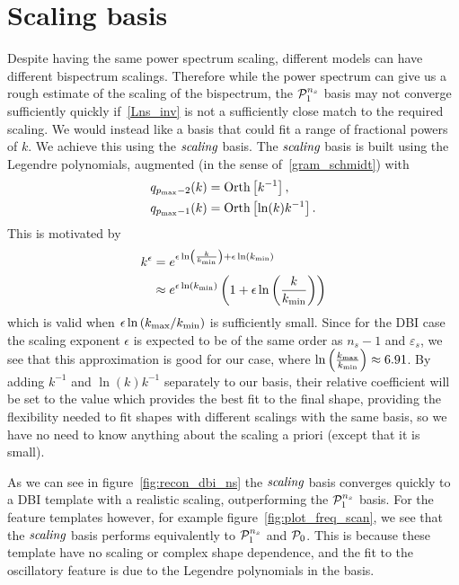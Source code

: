 \section{Scaling basis}\label{sec:scaling_definition}
    Despite having the same power spectrum scaling,
    different models can have different bispectrum scalings.
    Therefore while the power spectrum can give us a
    rough estimate of the scaling of the bispectrum,
    the $\mathcal{P}^{n_s}_1$ basis may not converge sufficiently quickly if~\eqref{Lns_inv}
    is not a sufficiently close match to the required scaling.
    We would instead like a basis that could fit
    a range of fractional powers of $k$.
    We achieve this using the $\textit{scaling}$ basis.
    The $\textit{scaling}$ basis is built using the Legendre polynomials,
    augmented (in the sense of~\eqref{gram_schmidt})
    with
    \begin{align}\label{scaling_basis_definition}
        q_{p_\text{max}-2}(k) &= \text{Orth}\left[{k^{-1}}\right],\\
        q_{p_\text{max}-1}(k) &= \text{Orth}\left[{\ln(k)k^{-1}}\right].
    \end{align}
    This is motivated by
    \begin{align}
        k^\epsilon &= e^{\epsilon\ln\left(\frac{k}{{k_\text{min}}}\right)+\epsilon\ln({k_\text{min}})}\\
                   &\approx e^{\epsilon\ln\left({k_\text{min}}\right)}
                      \left(1+\epsilon\ln\left(\frac{k}{{k_\text{min}}}\right)\right)
    \end{align}
    which is valid when $\epsilon\ln\left({k_\text{max}}/{k_\text{min}}\right)$ is
    sufficiently small.
    Since for the DBI case the scaling exponent $\epsilon$ is expected to be of the
    same order as $n_s-1$ and $\varepsilon_s$, we see that this
    approximation is good for our case,
    where $\ln\left(\frac{{k_\text{max}}}{{k_\text{min}}}\right)\approx6.91$.
    By adding $k^{-1}$ and $\ln(k)k^{-1}$ separately to our
    basis, their relative coefficient will be set to the value
    which provides the best fit to the final shape,
    providing the flexibility needed to fit shapes with different
    scalings with the same basis, so we have no need to know anything
    about the scaling a priori (except that it is small).

    As we can see in figure~\ref{fig:recon_dbi_ns} the $\textit{scaling}$ basis
    converges quickly to a DBI template with a realistic scaling, outperforming
    the $\mathcal{P}^{n_s}_1$ basis. For the feature templates however,
    for example figure~\ref{fig:plot_freq_scan},
    we see that the $\textit{scaling}$ basis performs equivalently to $\mathcal{P}^{n_s}_1$
    and $\mathcal{P}_0$.
    This is because these template have no scaling or complex shape dependence,
    and the fit to the oscillatory feature is due to the Legendre polynomials
    in the basis.

